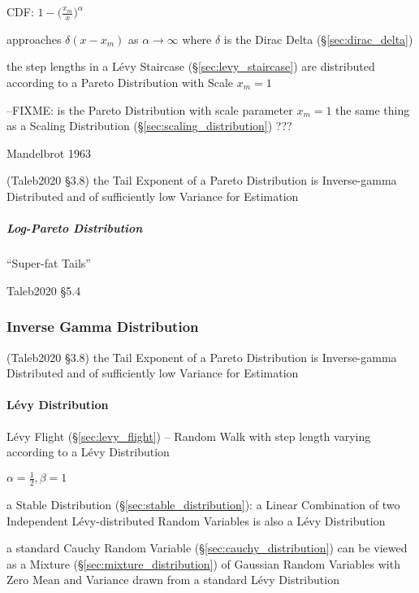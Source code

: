 CDF: $1 - \Big(\frac{x_m}{x}\Big)^\alpha$

approaches $\delta(x - x_m)$ as $\alpha \to \infty$ where $\delta$ is the Dirac
Delta (\S\ref{sec:dirac_delta})

the step lengths in a L\'evy Staircase (\S\ref{sec:levy_staircase}) are
distributed according to a Pareto Distribution with Scale $x_m = 1$

--FIXME: is the Pareto Distribution with scale parameter $x_m = 1$ the same
thing as a Scaling Distribution (\S\ref{sec:scaling_distribution}) ???

Mandelbrot 1963

(Taleb2020 \S 3.8) the Tail Exponent of a Pareto Distribution is Inverse-gamma
Distributed and of sufficiently low Variance for Estimation



\subparagraph{Log-Pareto Distribution}\label{sec:log_pareto}\hfill

``Super-fat Tails''

Taleb2020 \S 5.4



\subsubsection{Inverse Gamma Distribution}\label{sec:inverse_gamma}


(Taleb2020 \S 3.8) the Tail Exponent of a Pareto Distribution is Inverse-gamma
Distributed and of sufficiently low Variance for Estimation



\paragraph{L\'evy Distribution}\label{sec:levy_distribution}\hfill

L\'evy Flight (\S\ref{sec:levy_flight}) -- Random Walk with step length varying
according to a L\'evy Distribution

$\alpha = \frac{1}{2}, \beta = 1$

a Stable Distribution (\S\ref{sec:stable_distribution}): a Linear Combination of
two Independent L\'evy-distributed Random Variables is also a L\'evy
Distribution

a standard Cauchy Random Variable (\S\ref{sec:cauchy_distribution}) can be
viewed as a Mixture (\S\ref{sec:mixture_distribution}) of Gaussian Random
Variables with Zero Mean and Variance drawn from a standard L\'evy Distribution

